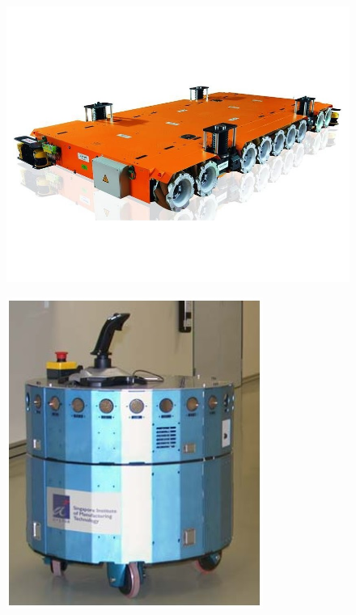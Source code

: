\begin{figure}
	\centering
	\begin{minipage}{.5\textwidth}
		\centering
		\includegraphics[width=\linewidth]{Chapter1/fig/kukaAGV}
		\label{fig:kukaagv}
	\end{minipage}%
	\begin{minipage}{.5\textwidth}
		\centering
		\includegraphics[width=.8\linewidth]{Chapter1/fig/PCW-4}
		 \label{fig:PCWLi}
	\end{minipage}
\end{figure}

